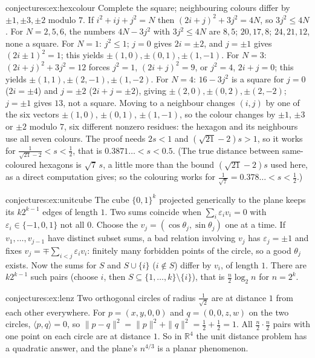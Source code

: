 \begin{solution}{conjectures:ex:hexcolour}
\idea Complete the square; neighbouring colours differ by $\pm1,\pm3,\pm2$ modulo $7$.
\writeup If $i^2+ij+j^2=N$ then $(2i+j)^2+3j^2=4N$, so $3j^2\le4N$. For $N=2,5,6$, the numbers $4N-3j^2$ with $3j^2\le4N$ are $8,5$; $20,17,8$;
$24,21,12$, none a square. For $N=1$: $j^2\le1$; $j=0$ gives $2i=\pm2$, and $j=\pm1$ gives $(2i\pm1)^2=1$; this yields $\pm(1,0),\pm(0,1),\pm(1,-1)$. For
$N=3$: $(2i+j)^2+3j^2=12$ forces $j^2=1$, $(2i+j)^2=9$, or $j^2=4$, $2i+j=0$; this yields $\pm(1,1),\pm(2,-1),\pm(1,-2)$. For $N=4$: $16-3j^2$ is a square
for $j=0$ ($2i=\pm4$) and $j=\pm2$ ($2i+j=\pm2$), giving $\pm(2,0),\pm(0,2),\pm(2,-2)$; $j=\pm1$ gives $13$, not a square.
Moving to a neighbour changes $(i,j)$ by one of the six vectors $\pm(1,0)$, $\pm(0,1)$, $\pm(1,-1)$, so the colour changes by $\pm1$, $\pm3$
or $\pm2$ modulo $7$, six different nonzero residues: the hexagon and its neighbours use all seven colours. The proof needs $2s<1$ and $(\sqrt{21}-2)s>1$, so it works for
$\frac1{\sqrt{21}-2}<s<\frac12$, that is $0.3871\ldots<s<0.5$. (The true distance between same-coloured hexagons is $\sqrt7\,s$, a little more than the bound $(\sqrt{21}-2)s$
used here, as a direct computation gives; so the colouring works for $\frac1{\sqrt7}=0.378\ldots<s<\frac12$.)
\end{solution}

\begin{solution}{conjectures:ex:unitcube}
\idea The cube $\{0,1\}^k$ projected generically to the plane keeps its $k2^{k-1}$ edges of length $1$.
\writeup Two sums coincide when $\sum_i\varepsilon_iv_i=0$ with $\varepsilon_i\in\{-1,0,1\}$ not all $0$. Choose the $v_j=(\cos\theta_j,\sin\theta_j)$
one at a time. If $v_1,\dots,v_{j-1}$ have distinct subset sums, a bad relation involving $v_j$ has $\varepsilon_j=\pm1$ and fixes
$v_j=\mp\sum_{i<j}\varepsilon_iv_i$: finitely many forbidden points of the circle, so a good $\theta_j$ exists. Now the sums for $S$ and $S\cup\{i\}$
($i\notin S$) differ by $v_i$, of length $1$. There are $k2^{k-1}$ such pairs (choose $i$, then $S\subseteq\{1,\dots,k\}\setminus\{i\}$), that is
$\frac n2\log_2n$ for $n=2^k$.
\end{solution}

\begin{solution}{conjectures:ex:lenz}
\idea Two orthogonal circles of radius $\frac1{\sqrt2}$ are at distance $1$ from each other everywhere.
\writeup For $p=(x,y,0,0)$ and $q=(0,0,z,w)$ on the two circles, $\langle p,q\rangle=0$, so $\|p-q\|^2=\|p\|^2+\|q\|^2=\frac12+\frac12=1$. All
$\frac n2\cdot\frac n2$ pairs with one point on each circle are at distance $1$. So in $\mathbb R^4$ the unit distance problem has a quadratic answer, and
the plane's $n^{4/3}$ is a planar phenomenon.
\end{solution}

